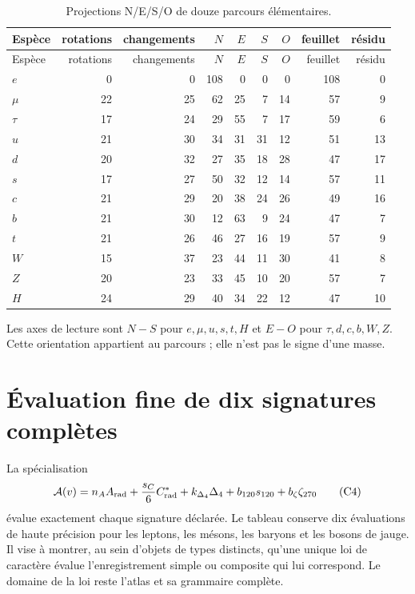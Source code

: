 \begin{longtable}{@{}lrrrrrrrr@{}}
\caption{Projections N/E/S/O de douze parcours élémentaires.}
\label{tab:doce-huellas-ruta-rev6}\\
\toprule
Espèce&rotations&changements&\(N\)&\(E\)&\(S\)&\(O\)&feuillet&résidu\\
\midrule
\endfirsthead
\toprule
Espèce&rotations&changements&\(N\)&\(E\)&\(S\)&\(O\)&feuillet&résidu\\
\midrule
\endhead
\(e\)&0&0&108&0&0&0&108&0\\
\(\mu\)&22&25&62&25&7&14&57&9\\
\(\tau\)&17&24&29&55&7&17&59&6\\
\(u\)&21&30&34&31&31&12&51&13\\
\(d\)&20&32&27&35&18&28&47&17\\
\(s\)&17&27&50&32&12&14&57&11\\
\(c\)&21&29&20&38&24&26&49&16\\
\(b\)&21&30&12&63&9&24&47&7\\
\(t\)&21&26&46&27&16&19&57&9\\
\(W\)&15&37&23&44&11&30&41&8\\
\(Z\)&20&23&33&45&10&20&57&7\\
\(H\)&24&29&40&34&22&12&47&10\\
\bottomrule
\end{longtable}

Les axes de lecture sont \(N\!-\!S\) pour
\(e,\mu,u,s,t,H\) et \(E\!-\!O\) pour
\(\tau,d,c,b,W,Z\). Cette orientation appartient au parcours ; elle n'est pas le signe d'une
masse.

\section{Évaluation fine de dix signatures complètes}

La spécialisation
\[
\mathcal A(v)=
n_AA_{\rm rad}
+\frac{s_C}{6}C^*_{\rm rad}
+k_{\Delta_4}\Delta_4
+b_{120}s_{120}
+b_{\zeta}\zeta_{270}
\tag{C4}\label{eq:evaluacion-fina-catalogo}
\]
évalue exactement chaque signature déclarée. Le tableau conserve dix évaluations
de haute précision pour les leptons, les mésons, les baryons et les bosons de jauge. Il vise
à montrer, au sein d'objets de types distincts, qu'une unique loi de
caractère évalue l'enregistrement simple ou composite qui lui correspond. Le
domaine de la loi reste l'atlas et sa grammaire complète.

